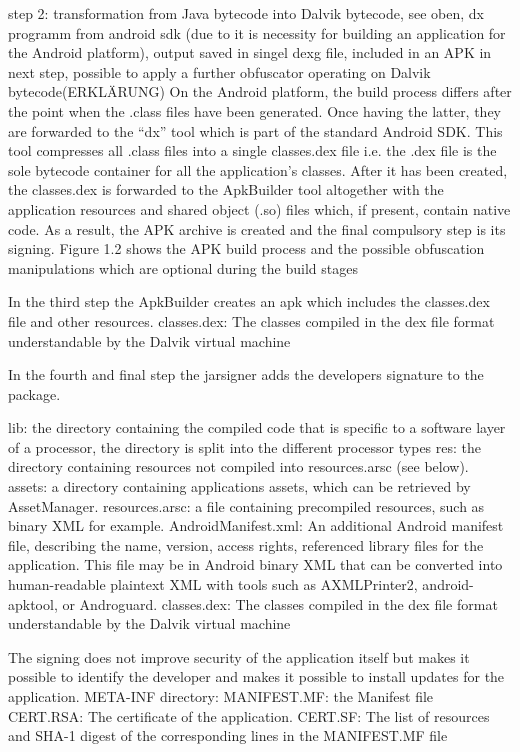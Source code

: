 step 2: transformation from Java bytecode into Dalvik bytecode, see oben, dx programm from android sdk (due to it is necessity for building an application for the Android platform), output saved in singel \gls{dexg} file, included in an APK in next step, possible to apply a further obfuscator operating
on Dalvik bytecode(ERKLÄRUNG)\newline
On the Android platform, the build process differs after the point when the .class files have been generated. Once having the latter, they are forwarded to the “dx” tool which is part of the standard Android SDK. This tool compresses all .class files into a single classes.dex file i.e. the .dex file is the sole bytecode container for all the application’s classes. After it has been created, the classes.dex is forwarded to the ApkBuilder tool altogether with the application resources and shared object (.so) files which, if present, contain native code. As a result, the APK archive is created and the final compulsory step is its signing. Figure 1.2 shows the APK build process and the
possible obfuscation manipulations which are optional during the build stages\newline

In the third step the ApkBuilder creates an \gls{apk} which includes the classes.dex file and other resources.
classes.dex: The classes compiled in the dex file format understandable by the Dalvik virtual machine

In the fourth and final step the jarsigner adds the developers signature to the package.

lib: the directory containing the compiled code that is specific to a software layer of a processor, the directory is split into the different processor types
res: the directory containing resources not compiled into resources.arsc (see below).
assets: a directory containing applications assets, which can be retrieved by AssetManager.
resources.arsc: a file containing precompiled resources, such as binary XML for example.
AndroidManifest.xml: An additional Android manifest file, describing the name, version, access rights, referenced library files for the application. This file may be in Android binary XML that can be converted into human-readable plaintext XML with tools such as AXMLPrinter2, android-apktool, or Androguard.
classes.dex: The classes compiled in the dex file format understandable by the Dalvik virtual machine


The signing does not improve security of the application itself but makes it possible to identify the developer and makes it possible to install updates for the application.
META-INF directory:
    MANIFEST.MF: the Manifest file
    CERT.RSA: The certificate of the application.
    CERT.SF: The list of resources and SHA-1 digest of the corresponding lines in the MANIFEST.MF file



